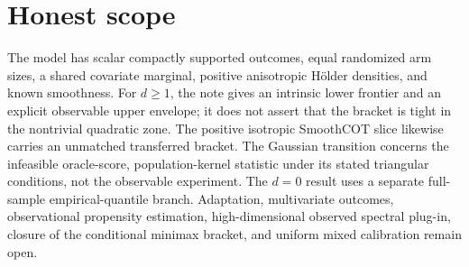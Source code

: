 \documentclass{article}
\begin{document}
\section{Honest scope}

The model has scalar compactly supported outcomes, equal randomized arm sizes, a shared covariate marginal, positive anisotropic H\"older densities, and known smoothness. For \(d\ge1\), the note gives an intrinsic lower frontier and an explicit observable upper envelope; it does not assert that the bracket is tight in the nontrivial quadratic zone. The positive isotropic SmoothCOT slice likewise carries an unmatched transferred bracket. The Gaussian transition concerns the infeasible oracle-score, population-kernel statistic under its stated triangular conditions, not the observable experiment. The \(d=0\) result uses a separate full-sample empirical-quantile branch. Adaptation, multivariate outcomes, observational propensity estimation, high-dimensional observed spectral plug-in, closure of the conditional minimax bracket, and uniform mixed calibration remain open.
\end{document}
